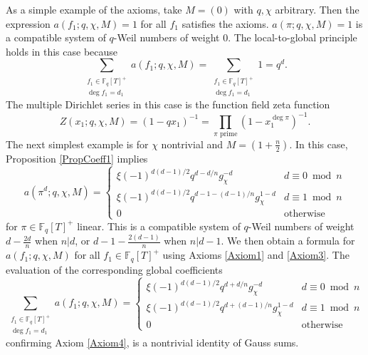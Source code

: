 \documentclass[11pt,letterpaper]{article}
\theoremstyle{definition}
\theoremstyle{remark}
\numberwithin{equation}{section}
\theoremstyle{dotless}
\newcommand{\F}{\mathbb{F}}
\begin{document}
As a simple example of the axioms, take $M=(0)$ with $q, \chi$ arbitrary. Then the expression $a(f_1; q, \chi, M)=1$ for all $f_1$ satisfies the axioms. $a(\pi; q, \chi, M)=1$ is a compatible system of $q$-Weil numbers of weight 0. The local-to-global principle holds in this case because 
\begin{equation*}
\sum_{\substack{f_1 \in \F_q[T]^+ \\ \deg f_1 = d_1}} a(f_1; q, \chi, M) = \sum_{\substack{f_1 \in \F_q[T]^+ \\ \deg f_1 = d_1}} 1 = q^d.
\end{equation*}
The multiple Dirichlet series in this case is the function field zeta function 
\begin{equation*}
Z(x_1; q, \chi, M) = (1-qx_1)^{-1} = \prod_{\pi \text{ prime}} (1-x_1^{\deg \pi})^{-1}.
\end{equation*}
The next simplest example is for $\chi$ nontrivial and $M=(1+\tfrac{n}{2})$. In this case, Proposition \ref{PropCoeff1} implies 
\begin{equation*}
a(\pi^d; q, \chi, M) = \left\lbrace \begin{array}{cc} \xi(-1)^{d(d-1)/2}q^{d-d/n} g_\chi^{-d} & d \equiv 0 \bmod n \\\xi(-1)^{d(d-1)/2}q^{d-1-(d-1)/n}g_\chi^{1-d} & d \equiv 1 \bmod n \\ 0 & \text{otherwise} \end{array} \right.
\end{equation*}
for $\pi \in \F_q[T]^+$ linear. This is a compatible system of $q$-Weil numbers of weight $d-\frac{2d}{n}$ when $n|d$, or $d-1-\frac{2(d-1)}{n}$ when $n|d-1$. We then obtain a formula for $a(f_1; q, \chi, M)$ for all $f_1 \in \F_q[T]^+$ using Axioms \ref{Axiom1} and \ref{Axiom3}. The evaluation of the corresponding global coefficients 
\begin{equation*}
\sum_{\substack{f_1 \in \F_q[T]^+ \\ \deg f_1 = d_1}} a(f_1; q, \chi, M) = \left\lbrace \begin{array}{cc} \xi(-1)^{d(d-1)/2}q^{d+d/n} g_\chi^{-d} & d \equiv 0 \bmod n \\\xi(-1)^{d(d-1)/2}q^{d+(d-1)/n}g_\chi^{1-d} & d \equiv 1 \bmod n \\ 0 & \text{otherwise} \end{array} \right.
\end{equation*}
confirming Axiom \ref{Axiom4}, is a nontrivial identity of Gauss sums. 
\end{document}

